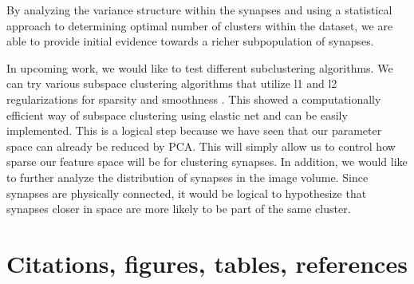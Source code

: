 \documentclass{article}
\begin{document}
By analyzing the variance structure within the synapses and using a statistical approach to determining optimal number of clusters within the dataset, we are able to provide initial evidence towards a richer subpopulation of synapses. 

In upcoming work, we would like to test different subclustering algorithms. We can try various subspace clustering algorithms that utilize l1 and l2 regularizations for sparsity and smoothness \cite{You}. This showed a computationally efficient way of subspace clustering using elastic net and can be easily implemented. This is a logical step because we have seen that our parameter space can already be reduced by PCA. This will simply allow us to control how sparse our feature space will be for clustering synapses. In addition, we would like to further analyze the distribution of synapses in the image volume. Since synapses are physically connected, it would be logical to hypothesize that synapses closer in space are more likely to be part of the same cluster.


\newpage
\section{Citations, figures, tables, references}
\label{others}

\FloatBarrier
\end{document}
